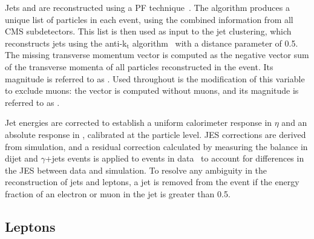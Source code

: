 Jets and \MET are reconstructed using a \ac{PF}
technique~\cite{PFT-09-001}. The algorithm produces a unique list 
of particles in each event, using the combined information from all 
CMS subdetectors. This list is then used as input to the jet 
clustering, which reconstructs jets using the anti-k$_{\mathrm{t}}$
algorithm~\cite{bib:akjets} with a distance parameter of 0.5.  
The missing transverse momentum vector \METv is computed as the negative vector 
sum of the transverse momenta of all particles reconstructed in the 
event.
Its magnitude is referred to as \MET.
Used throughout is the modification of this variable to exclude muons: the vector \METvmu is computed without muons, and its magnitude is referred to as \METmu. 

Jet energies are corrected to establish a uniform calorimeter 
response in $\eta$ and an absolute response in \pt, calibrated at 
the particle level.  
\ac{JES} corrections are derived from simulation, and a residual correction calculated by measuring the \pt balance in dijet and $\gamma$+jets events is applied to events in data~\cite{JETJINST} to account for differences in the \ac{JES} between data and simulation.
To resolve any ambiguity in the reconstruction of jets and leptons, a jet is removed from the event if the energy fraction of an electron or muon in the jet is greater than 0.5.



\subsection{Leptons}
\label{sec:objectReco:lep}


